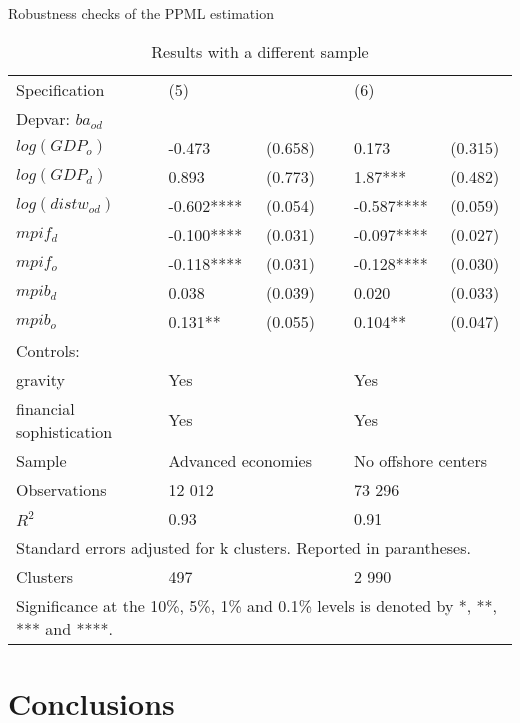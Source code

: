 \documentclass{beamer}
\begin{document}
\begin{frame}{Robustness checks of the PPML estimation}
\begin{table}[!h]
\tiny
\centering
\begin{tabular}{ l l l l l l}
\hline
Specification&(5)&&&(6)& \\
Depvar: $ba_{od}$&&&&&\\
\hline
$log(GDP_{o})$&-0.473&(0.658)&&0.173&(0.315)\\
$log(GDP_{d})$&0.893&(0.773)&&1.87***&(0.482)\\
$log(distw_{od})$&-0.602****&(0.054)&&-0.587****&(0.059)\\
$mpif_{d}$&-0.100****&(0.031)&&-0.097****&(0.027)\\
$mpif_{o}$&-0.118****&(0.031)&&-0.128****&(0.030)\\
$mpib_{d}$&0.038&(0.039)&&0.020&(0.033)\\
$mpib_{o}$&0.131**&(0.055)&&0.104**&(0.047)\\
Controls:&&&&&\\
gravity &Yes&&&Yes& \\ 
financial sophistication &Yes&&&Yes& \\
\hline
Sample &\multicolumn{2}{l}{Advanced economies}&&\multicolumn{2}{l}{No offshore centers} \\
Observations &12 012&&&73 296& \\
\hline
$R^2$&0.93&&&0.91&\\
\hline
\multicolumn{6}{l}{Standard errors adjusted for k clusters. Reported in parantheses. }\\
Clusters &497&&&2 990& \\
\hline
\multicolumn{6}{l}{\tiny Significance at the 10\%, 5\%, 1\% and 0.1\% levels is denoted by *, **, *** and ****.}\\
\end{tabular}
\caption{Results with a different sample}
\label{tab:robust2}
\end{table}

\end{frame}

\section{Conclusions}

\end{document}
